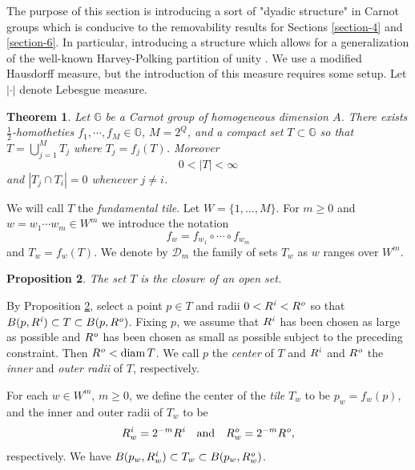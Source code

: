 \documentclass[12pt,a4paper,reqno]{amsart}
\newcommand{\inn}{{\it i}}
\newcommand{\out}{{\it o}}
\newcommand{\Rinn}{R^{\inn}}
\newcommand{\Rout}{R^{\out}}
\newcommand{\G}{\mathbb{G}}
\newcommand{\diam}{\operatorname{diam}}
\numberwithin{equation}{section}
\newtheorem{thm}{Theorem}[section]
\newtheorem{prop}[thm]{Proposition}
\theoremstyle{definition}
\begin{document}
The purpose of this section is introducing a sort of "dyadic structure" in Carnot groups which is conducive to the removability results for Sections \ref{section-4} and \ref{section-6}. In particular, introducing a structure which allows for a generalization of the well-known Harvey-Polking partition of unity \cite[Lemma 3.1]{HP}. We use a modified Hausdorff measure, but the introduction of this measure requires some setup. Let $| \cdot |$ denote Lebesgue measure. 
\begin{thm}\cite[Theorem 3.1]{CT}
    Let $\G$ be a Carnot group of homogeneous dimension $A$. There exists $\frac{1}{2}$-homotheties $f_1, \cdots , f_M \in \G$, $M= 2^Q$, and a compact set $T \subset \G$ so that $T = \bigcup_{j=1}^M T_j$ where $T_j = f_j(T)$. Moreover $$0 < |T| < \infty$$ and $|T_j \cap T_i| = 0$ whenever $j \neq i$.
\end{thm}
We will call $T$ the \textit{fundamental tile}. Let $W=\{1,\ldots,M\}$. For $m\geq 0$ and $w=w_1\cdots w_m \in W^m$ we
introduce the notation
\begin{equation}
f_w = f_{w_1}\circ\cdots\circ f_{w_m} \nonumber
\end{equation}
and $T_w=f_w(T)$. We denote by $\mathcal{D}_m$ the family of sets $T_w$ as $w$
ranges over $W^m$.

\begin{prop}\cite[Proposition 3.4]{CT}\label{T-property-1}
The set $T$ is the closure of an open set.
\end{prop}

By Proposition \ref{T-property-1}, select a point $p \in
T$ and radii $0<\Rinn<\Rout$ so that $B(p,\Rinn) \subset T
\subset B(p,\Rout)$. Fixing $p$, we assume that $\Rinn$ has been
chosen as large as possible and $\Rout$ has been chosen as small as
possible subject to the preceding constraint. Then $\Rout < \diam T$. We call $p$ the
\textit{center} of $T$ and $\Rinn$ and $\Rout$ the \textit{inner} and
\textit{outer radii} of $T$, respectively.


For each $w \in W^m$, $m\ge 0$, we define the center of the \textit{tile}
$T_w$ to be $p_w = f_w(p)$, and the inner and outer radii of $T_w$ to be
$$
\Rinn_w = 2^{-m}\Rinn \quad \mbox{and} \quad \Rout_w=2^{-m}\Rout,
$$
respectively. We have $B(p_w,\Rinn_w) \subset T_w \subset B(p_w,\Rout_w)$.
\end{document}
